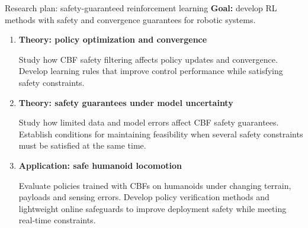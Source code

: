 \documentclass[aspectratio=169,10pt]{beamer}
\newcommand{\pos}[1]{\textcolor{positive}{#1}}
\begin{document}
\begingroup
{}

\begin{frame}{Research plan: safety-guaranteed reinforcement learning}
\pos{\textbf{Goal:}} develop RL methods with safety and convergence guarantees for robotic systems.
\par\vspace{.75em}
\begin{enumerate}\setlength\itemsep{1.2em}
\item \textbf{Theory: policy optimization and convergence}\par\vspace{.2em}
Study how CBF safety filtering affects policy updates and convergence. Develop learning rules that improve control performance while satisfying safety constraints.
\item \textbf{Theory: safety guarantees under model uncertainty}\par\vspace{.2em}
Study how limited data and model errors affect CBF safety guarantees. Establish conditions for maintaining feasibility when several safety constraints must be satisfied at the same time.
\item \textbf{Application: safe humanoid locomotion}\par\vspace{.2em}
Evaluate policies trained with CBFs on humanoids under changing terrain, payloads and sensing errors. Develop policy verification methods and lightweight online safeguards to improve deployment safety while meeting real-time constraints.
\end{enumerate}
\end{frame}
\endgroup
\end{document}
